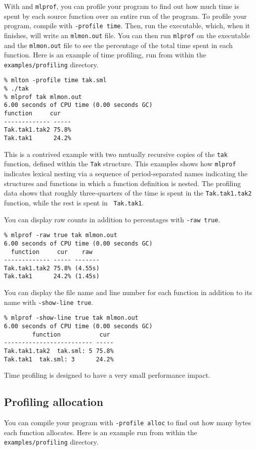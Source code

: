 %
With {\mlton} and {\tt mlprof}, you can profile your program to find
out how much time is spent by each source function over an entire run
of the program.  To profile your program, compile with {\tt -profile
time}.  Then, run the executable, which, when it finishes, will write
an {\tt mlmon.out} file.  You can then run {\tt mlprof} on the
executable and the {\tt mlmon.out} file to see the percentage of the
total time spent in each function.  Here is an example of time
profiling, run from within the {\tt examples/profiling} directory.
\begin{verbatim}
% mlton -profile time tak.sml
% ./tak
% mlprof tak mlmon.out
6.00 seconds of CPU time (0.00 seconds GC)
function     cur 
------------- -----
Tak.tak1.tak2 75.8%
Tak.tak1      24.2%
\end{verbatim}
This is a contrived example with two mutually recursive copies of the
{\tt tak} function, defined within the {\tt Tak} structure.  This
examples shows how {\tt mlprof} indicates lexical nesting via a
sequence of period-separated names indicating the structures and
functions in which a function definition is nested.  The profiling
data shows that roughly three-quarters of the time is spent in the
{\tt Tak.tak1.tak2} function, while the rest is spent in {\tt
Tak.tak1}.

You can display raw counts in addition to percentages with {\tt -raw
true}.
\begin{verbatim}
% mlprof -raw true tak mlmon.out
6.00 seconds of CPU time (0.00 seconds GC)
  function     cur    raw  
------------- ----- -------
Tak.tak1.tak2 75.8% (4.55s)
Tak.tak1      24.2% (1.45s)
\end{verbatim}
%
You can display the file name and line number for each function in
addition to its name with {\tt -show-line true}.
\begin{verbatim}
% mlprof -show-line true tak mlmon.out
6.00 seconds of CPU time (0.00 seconds GC)
        function           cur 
------------------------- -----
Tak.tak1.tak2  tak.sml: 5 75.8%
Tak.tak1  tak.sml: 3      24.2%
\end{verbatim}

Time profiling is designed to have a very small performance impact.

\subsection{Profiling allocation}

You can compile your program with {\tt -profile alloc} to find out how
many bytes each function allocates.  Here is an example run from
within the {\tt examples/profiling} directory.

